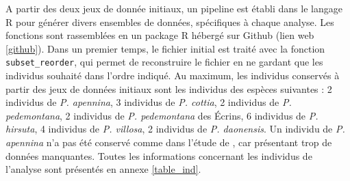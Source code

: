 A partir des deux jeux de donnée initiaux, un pipeline est établi dans le langage R \citep{RTeam2017} pour générer divers ensembles de données, spécifiques à chaque analyse.
 Les fonctions sont rassemblées en un package R hébergé sur Github (lien web \ref{github}).
 Dans un premier temps, le fichier initial est traité avec la fonction \verb|subset_reorder|, qui permet de reconstruire le fichier en ne gardant que les individus souhaité dans l'ordre indiqué.
 Au maximum, les individus conservés à partir des jeux de données initiaux sont les individus des espèces suivantes :
2 individus de \textit{P. apennina}, 
3 individus de \textit{P. cottia}, 
2 individus de \textit{P. pedemontana}, 
2 individus de \textit{P. pedemontana} des Écrins, 
6 individus de \textit{P. hirsuta}, 
4 individus de \textit{P. villosa}, 
2 individus de \textit{P. daonensis}.
Un individu de \textit{P. apennina} n'a pas été conservé comme dans l'étude de \citet{Boucher2016a}, car présentant trop de données manquantes.
 Toutes les informations concernant les individus de l'analyse sont présentés en annexe \ref{table_ind}.



